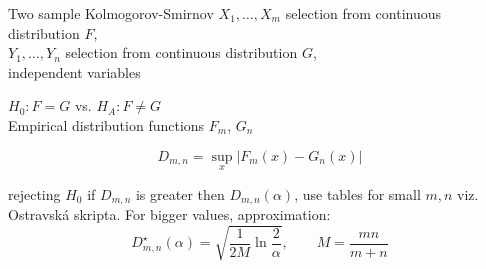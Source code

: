 \documentclass[smaller]{beamer}
\def\abs#1{\lvert#1\rvert}
\def\xskip{{\vspace{2ex}}}
\begin{document}
\begin{frame}{Two sample Kolmogorov-Smirnov}
$X_1, \dots ,X_m$ selection from continuous distribution $F$,\\
$Y_1, \dots ,Y_n$ selection from continuous distribution $G$,\\
independent variables

\xskip
$H_0: F=G$ vs. $H_A: F\ne G$\\
Empirical distribution functions $F_m$, $G_n$

\[
 D_{m,n} = \sup_{x}\abs{F_m(x) - G_n(x)}
\]

rejecting $H_0$ if $D_{m,n}$ is greater then $D_{m,n}(\alpha)$, use tables for small $m,n$ viz. Ostravská skripta.
For bigger values, approximation:
\[
 D^\star_{m,n}(\alpha) = \sqrt{\frac{1}{2M} \ln\frac{2}{\alpha}}, \qquad M = \frac{mn}{m+n}
\]
\end{frame}
\end{document}
